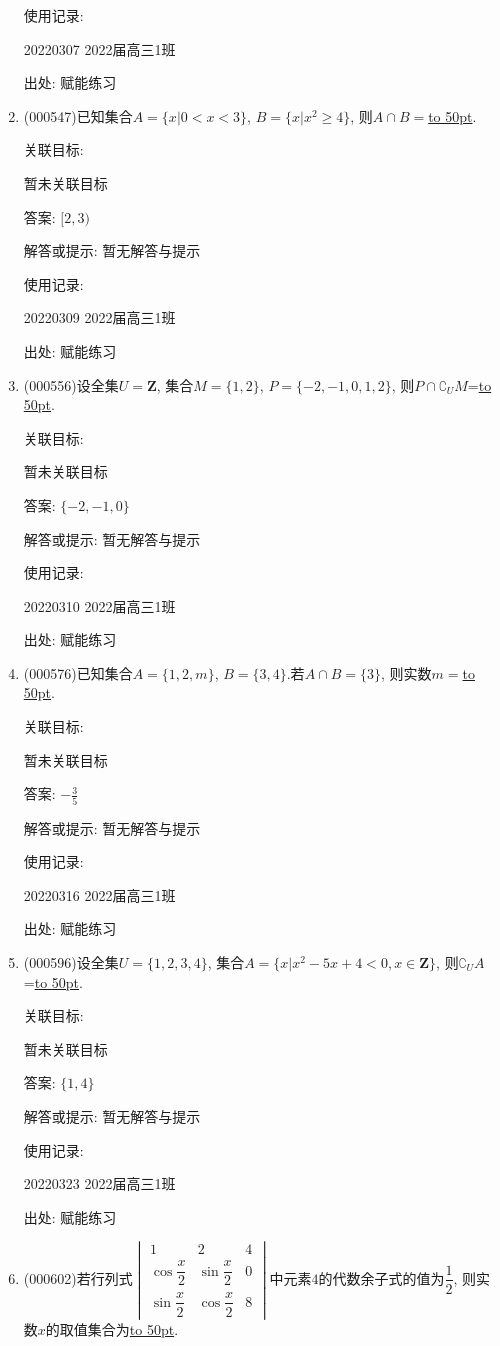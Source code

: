 \documentclass[10pt,a4paper]{article}
\newcommand{\blank}[1]{\underline{\hbox to #1pt{}}}
\begin{document}
\begin{enumerate}[1.]
使用记录:

20220307	2022届高三1班	


出处: 赋能练习
\item { (000547)}已知集合$A=\{x|0<x<3\}$, $B=\{x|x^2\ge 4\}$, 则$A\cap B=$\blank{50}.


关联目标:

暂未关联目标

答案: $[2,3)$

解答或提示: 暂无解答与提示

使用记录:

20220309	2022届高三1班	


出处: 赋能练习
\item { (000556)}设全集$U=\mathbf{Z}$, 集合$M=\{1,2\}$, $P=\{-2,-1,0,1,2\}$, 则$P\cap \complement_U M$=\blank{50}.


关联目标:

暂未关联目标

答案: $\{-2,-1,0\}$

解答或提示: 暂无解答与提示

使用记录:

20220310	2022届高三1班	


出处: 赋能练习
\item { (000576)}已知集合$A=\{1,2,m\}$, $B=\{3,4\}$.若$A\cap B=\{3\}$, 则实数$m=$\blank{50}.


关联目标:

暂未关联目标

答案: $-\frac 35$

解答或提示: 暂无解答与提示

使用记录:

20220316	2022届高三1班	


出处: 赋能练习
\item { (000596)}设全集$U=\{1,2,3,4\}$, 集合$A=\{x|x^2-5x+4<0,x\in \mathbf{Z}\}$, 则$\complement_U A$=\blank{50}.


关联目标:

暂未关联目标

答案: $\{1,4\}$

解答或提示: 暂无解答与提示

使用记录:

20220323	2022届高三1班	


出处: 赋能练习
\item { (000602)}若行列式$\begin{vmatrix} 1 & 2 & 4 \\ \cos \dfrac x2 & \sin \dfrac x2 & 0 \\ \sin \dfrac x2 & \cos \dfrac x2 & 8 \end{vmatrix}$中元素$4$的代数余子式的值为$\dfrac12$, 则实数$x$的取值集合为\blank{50}.



\end{enumerate}
\end{document}
